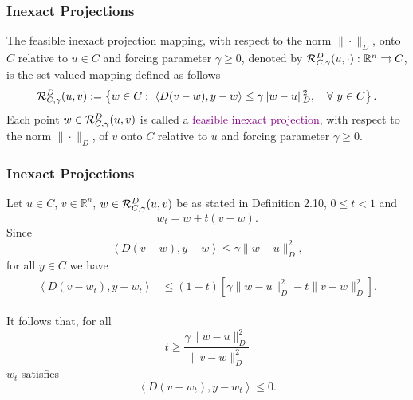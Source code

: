 \begin{frame}[t]\frametitle{Inexact Projections}
  \begin{definition}
    The feasible inexact projection mapping, with respect to the norm $\| \cdot \|_{D}$,  onto $C$ relative to $u \in C$ and forcing parameter $\gamma\geq 0$, denoted by ${\cal R}_{C,\gamma}^{D}(u, \cdot): {\mathbb R}^n \rightrightarrows C$,  is the set-valued mapping defined as follows
    \begin{equation*}
      {\cal R}_{C,\gamma}^{D}(u, v):= \left\{w\in C:~\left\langle D(v-w), y-w \right\rangle \leq \gamma \|w-u\|_{D}^2, \quad \forall~ y \in C \right\}.
    \end{equation*}
    Each point $w\in {\cal R}_{C,\gamma}^{D}(u, v)$ is called a \textcolor{purple}{feasible inexact projection},  with respect to the norm $\| \cdot \|_{D}$,  of $v$ onto $C$ relative to $u$ and forcing parameter $\gamma\geq 0$.
  \end{definition}
\end{frame}


\begin{frame}[t]\frametitle{Inexact Projections}
  Let $u\in C$, $v\in \mathbb{R}^n$, $w\in{\cal R}_{C,\gamma}^{D}(u, v)$ be as stated in Definition 2.10, $0\leq t <1$ and
  $$
    w_t = w+t(v-w).
  $$
  Since
  $$
    \left\langle D(v-w), y-w \right\rangle \leq \gamma \|w-u\|_{D}^2,
  $$
  for all $y\in C$ we have
  \begin{align*}
    \begin{aligned}
      \left\langle D(v-w_t), y-w_t \right\rangle & \leq  (1-t)\left[ \gamma \|w-u\|_D^2 - t\|v-w\|_D^2 \right].
    \end{aligned}
  \end{align*}

  It follows that, for all
  \begin{equation}
    t \geq \frac{\gamma \|w-u\|_D^2}{\|v-w\|_D^2}
  \end{equation}
  $w_t$ satisfies
  \begin{equation}
    \left\langle D(v-w_t), y-w_t \right\rangle\leq 0.
  \end{equation}
\end{frame}



